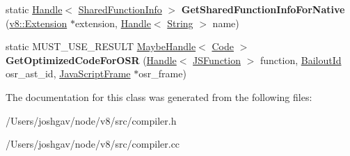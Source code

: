 \begin{DoxyCompactItemize}
\item 
static \hyperlink{classv8_1_1internal_1_1_handle}{Handle}$<$ \hyperlink{classv8_1_1internal_1_1_shared_function_info}{Shared\+Function\+Info} $>$ {\bfseries Get\+Shared\+Function\+Info\+For\+Native} (\hyperlink{classv8_1_1_extension}{v8\+::\+Extension} $\ast$extension, \hyperlink{classv8_1_1internal_1_1_handle}{Handle}$<$ \hyperlink{classv8_1_1internal_1_1_string}{String} $>$ name)\hypertarget{classv8_1_1internal_1_1_compiler_abe64eb3fc58b3c48f6339d913f501cd0}{}\label{classv8_1_1internal_1_1_compiler_abe64eb3fc58b3c48f6339d913f501cd0}

\item 
static M\+U\+S\+T\+\_\+\+U\+S\+E\+\_\+\+R\+E\+S\+U\+LT \hyperlink{classv8_1_1internal_1_1_maybe_handle}{Maybe\+Handle}$<$ \hyperlink{classv8_1_1internal_1_1_code}{Code} $>$ {\bfseries Get\+Optimized\+Code\+For\+O\+SR} (\hyperlink{classv8_1_1internal_1_1_handle}{Handle}$<$ \hyperlink{classv8_1_1internal_1_1_j_s_function}{J\+S\+Function} $>$ function, \hyperlink{classv8_1_1internal_1_1_bailout_id}{Bailout\+Id} osr\+\_\+ast\+\_\+id, \hyperlink{classv8_1_1internal_1_1_java_script_frame}{Java\+Script\+Frame} $\ast$osr\+\_\+frame)\hypertarget{classv8_1_1internal_1_1_compiler_a40cc9951c7ffabe5c5e2bfc740387345}{}\label{classv8_1_1internal_1_1_compiler_a40cc9951c7ffabe5c5e2bfc740387345}

\end{DoxyCompactItemize}


The documentation for this class was generated from the following files\+:\begin{DoxyCompactItemize}
\item 
/\+Users/joshgav/node/v8/src/compiler.\+h\item 
/\+Users/joshgav/node/v8/src/compiler.\+cc\end{DoxyCompactItemize}

